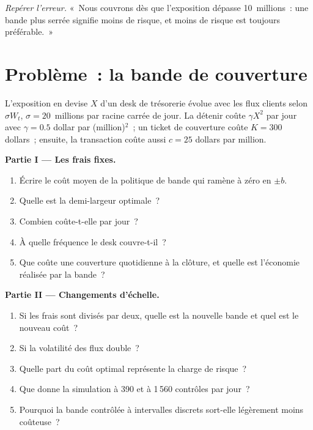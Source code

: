 \begin{exercise}[$\star\star\star$]\label{exo:qm:optimal-stopping-and-impulse-control:8}
\emph{Repérer l'erreur.} «~Nous couvrons dès que l'exposition dépasse 10~millions~: une bande plus serrée signifie moins de risque, et moins de risque est
toujours préférable.~»
\end{exercise}

\section{Problème~: la bande de couverture}

\begin{problem}\label{pb:qm:optimal-stopping-and-impulse-control:1}
L'exposition en devise $X$ d'un desk de trésorerie évolue avec les flux clients selon $\sigma W_t$, $\sigma = 20$~millions par racine carrée de jour. La détenir coûte
$\gamma X^2$ par jour avec $\gamma = 0.5$ dollar par (million)$^2$~; un ticket de couverture coûte $K = 300$ dollars~; ensuite, la transaction coûte aussi $c = 25$ dollars
par million.

\medskip\noindent\textbf{Partie I --- Les frais fixes.}
\begin{enumerate}
\item Écrire le coût moyen de la politique de bande qui ramène à zéro en $\pm b$.
\item Quelle est la demi-largeur optimale~?
\item Combien coûte-t-elle par jour~?
\item À quelle fréquence le desk couvre-t-il~?
\item Que coûte une couverture quotidienne à la clôture, et quelle est l'économie réalisée par la bande~?
\end{enumerate}

\medskip\noindent\textbf{Partie II --- Changements d'échelle.}
\begin{enumerate}[resume]
\item Si les frais sont divisés par deux, quelle est la nouvelle bande et quel est le nouveau coût~?
\item Si la volatilité des flux double~?
\item Quelle part du coût optimal représente la charge de risque~?
\item Que donne la simulation à 390 et à 1\,560 contrôles par jour~?
\item Pourquoi la bande contrôlée à intervalles discrets sort-elle légèrement moins coûteuse~?
\end{enumerate}


\end{problem}
